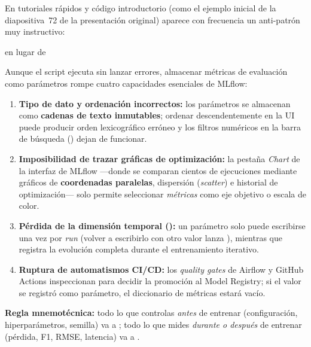 \begin{warningbox}
En tutoriales rápidos y código introductorio (como el ejemplo inicial de la diapositiva~72 de la presentación original) aparece con frecuencia un anti-patrón muy instructivo:
\begin{center}
 \quad en lugar de \quad {}
\end{center}
Aunque el script ejecuta sin lanzar errores, almacenar métricas de evaluación como parámetros rompe cuatro capacidades esenciales de MLflow:
\begin{enumerate}
  \item \textbf{Tipo de dato y ordenación incorrectos:} los parámetros se almacenan como \textbf{cadenas de texto inmutables}; ordenar descendentemente en la UI puede producir orden lexicográfico erróneo y los filtros numéricos en la barra de búsqueda () dejan de funcionar.
  \item \textbf{Imposibilidad de trazar gráficas de optimización:} la pestaña \textit{Chart} de la interfaz de MLflow ---donde se comparan cientos de ejecuciones mediante gráficos de \textbf{coordenadas paralelas}, dispersión (\textit{scatter}) e historial de optimización--- solo permite seleccionar \textit{métricas} como eje objetivo o escala de color.
  \item \textbf{Pérdida de la dimensión temporal ():} un parámetro solo puede escribirse una vez por \textit{run} (volver a escribirlo con otro valor lanza ), mientras que  registra la evolución completa durante el entrenamiento iterativo.
  \item \textbf{Ruptura de automatismos CI/CD:} los \textit{quality gates} de Airflow y GitHub Actions inspeccionan  para decidir la promoción al Model Registry; si el valor se registró como parámetro, el diccionario de métricas estará vacío.
\end{enumerate}
\textbf{Regla mnemotécnica:} todo lo que controlas \textit{antes} de entrenar (configuración, hiperparámetros, semilla) va a ; todo lo que mides \textit{durante o después} de entrenar (pérdida, F1, RMSE, latencia) va a .
\end{warningbox}

